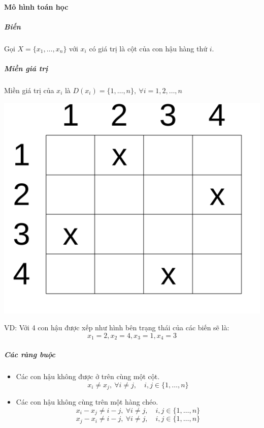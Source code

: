 \documentclass[a4paper,12pt]{report}
\begin{document}
\paragraph{Mô hình toán học}
\subparagraph{Biến}
Gọi $X=\{x_1,\ldots,x_n\}$ với $x_i$ có giá trị là cột của con hậu hàng thứ $i$.
\subparagraph{Miền giá trị}
Miền giá trị của $x_i$ là $D(x_i)=\{1,\ldots,n\}, \ \forall i=1,2,\dots,n$\\[0.5cm]
\begin{minipage}{0.3\textwidth}
\includegraphics[width=\textwidth]{n-queen.png}
\end{minipage}
\begin{minipage}{0.6\textwidth}
VD: Với 4 con hậu được xếp như hình bên trạng thái của các biến sẽ là: $$x_1=2,x_2=4,x_3=1,x_4=3$$
\end{minipage}
\subparagraph{Các ràng buộc}
\begin{itemize}
\item Các con hậu không được ở trên cùng một cột.
$$ x_i \neq x_j, \ \forall i \neq j, \quad i,j \in \{1,\dots,n\} $$
\item Các con hậu không cùng trên một hàng chéo.
$$x_i-x_j \neq i-j , \ \forall i \neq j, \quad i,j \in \{1,\dots,n\}$$
$$x_j-x_i \neq i-j, \ \forall i \neq j, \quad i,j \in \{1,\dots,n\}$$
\end{itemize} 
\end{document}
